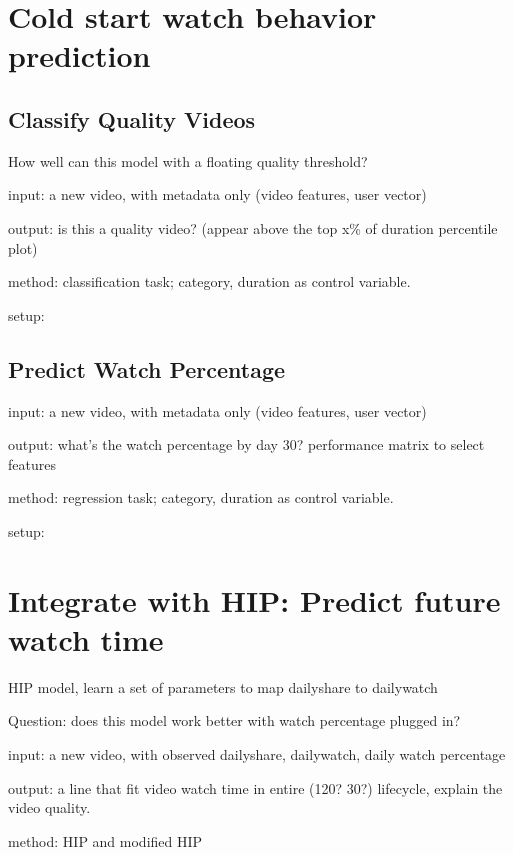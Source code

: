 
\section{Cold start watch behavior prediction}

\subsection{Classify Quality Videos}
How well can this model with a floating quality threshold?

input: a new video, with metadata only (video features, user vector)

output: is this a quality video? (appear above the top x\% of duration percentile plot)

method: classification task; category, duration as control variable.

setup: 

\subsection{Predict Watch Percentage}
input: a new video, with metadata only (video features, user vector)

output: what's the watch percentage by day 30? performance matrix to select features

method: regression task; category, duration as control variable.

setup: 


\section{Integrate with HIP: Predict future watch time}
HIP model, learn a set of parameters to map dailyshare to dailywatch

Question: does this model work better with watch percentage plugged in?

input: a new video, with observed dailyshare, dailywatch, daily watch percentage

output: a line that fit video watch time in entire (120? 30?) lifecycle, explain the video quality.

method: HIP and modified HIP



